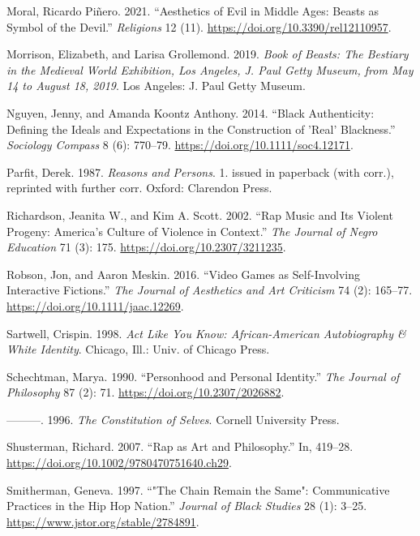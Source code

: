 \documentclass[
  letterpaper,
  DIV=11,
  numbers=noendperiod]{scrreprt}
\newlength{\cslhangindent}
\newenvironment{CSLReferences}[2] %
 {\begin{list}{}{%
  \setlength{\itemindent}{0pt}
  \setlength{\leftmargin}{0pt}
  \setlength{\parsep}{0pt}
  \ifodd #1
   \setlength{\leftmargin}{\cslhangindent}
   \setlength{\itemindent}{-1\cslhangindent}
  \fi
  \setlength{\itemsep}{#2\baselineskip}}}
 {\end{list}}
\begin{document}
\begin{tcolorbox}[enhanced jigsaw, arc=.35mm, breakable, rightrule=.15mm, colback=white, colframe=quarto-callout-important-color-frame, bottomrule=.15mm, leftrule=.75mm, opacityback=0, toprule=.15mm, left=2mm]
\begin{tcolorbox}[enhanced jigsaw, arc=.35mm, breakable, rightrule=.15mm, colback=white, colframe=quarto-callout-tip-color-frame, bottomrule=.15mm, leftrule=.75mm, opacityback=0, toprule=.15mm, left=2mm]
\begin{CSLReferences}{1}{0}
Moral, Ricardo Piñero. 2021. {``Aesthetics of {Evil} in {Middle Ages}:
{Beasts} as {Symbol} of the {Devil}.''} \emph{Religions} 12 (11).
\url{https://doi.org/10.3390/rel12110957}.

Morrison, Elizabeth, and Larisa Grollemond. 2019. \emph{Book of Beasts:
The Bestiary in the Medieval World {Exhibition}, {Los Angeles}, {J}.
{Paul Getty Museum}, from {May} 14 to {August} 18, 2019}. Los Angeles:
J. Paul Getty Museum.

Nguyen, Jenny, and Amanda Koontz Anthony. 2014. {``Black {Authenticity}:
{Defining} the {Ideals} and {Expectations} in the {Construction} of
'{Real}' {Blackness}.''} \emph{Sociology Compass} 8 (6): 770--79.
\url{https://doi.org/10.1111/soc4.12171}.

Parfit, Derek. 1987. \emph{Reasons and {Persons}}. 1. issued in
paperback (with corr.), reprinted with further corr. Oxford: Clarendon
Press.

Richardson, Jeanita W., and Kim A. Scott. 2002. {``Rap {Music} and {Its
Violent Progeny}: {America}'s {Culture} of {Violence} in {Context}.''}
\emph{The Journal of Negro Education} 71 (3): 175.
\url{https://doi.org/10.2307/3211235}.

Robson, Jon, and Aaron Meskin. 2016. {``Video {Games} as {Self-Involving
Interactive Fictions}.''} \emph{The Journal of Aesthetics and Art
Criticism} 74 (2): 165--77. \url{https://doi.org/10.1111/jaac.12269}.

Sartwell, Crispin. 1998. \emph{Act Like {You Know}: {African-American
Autobiography} \& {White Identity}}. Chicago, Ill.: Univ. of Chicago
Press.

Schechtman, Marya. 1990. {``Personhood and {Personal Identity}.''}
\emph{The Journal of Philosophy} 87 (2): 71.
\url{https://doi.org/10.2307/2026882}.

---------. 1996. \emph{The {Constitution} of {Selves}}. Cornell
University Press.

Shusterman, Richard. 2007. {``Rap as {Art} and {Philosophy}.''} In,
419--28. \url{https://doi.org/10.1002/9780470751640.ch29}.

Smitherman, Geneva. 1997. {``"{The Chain Remain} the {Same}":
{Communicative Practices} in the {Hip Hop Nation}.''} \emph{Journal of
Black Studies} 28 (1): 3--25.
\url{https://www.jstor.org/stable/2784891}.


\end{CSLReferences}
\end{tcolorbox}
\end{tcolorbox}
\end{document}
